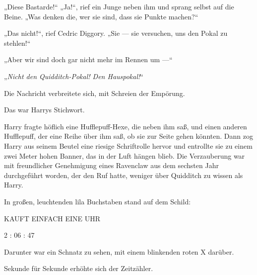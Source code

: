 „Diese Bastarde!“
„Ja!“, rief ein Junge neben ihm und sprang selbst auf die Beine.
„Was denken die, wer sie sind, dass sie Punkte machen?“

„Das nicht!“, rief Cedric Diggory.
„Sie — sie versuchen, uns den Pokal zu stehlen!“

„Aber wir sind doch gar nicht mehr im Rennen um —“

„\emph{Nicht den Quidditch-Pokal! Den Hauspokal!}“

Die Nachricht verbreitete sich, mit Schreien der Empörung.

Das war Harrys Stichwort.

Harry fragte höflich eine Hufflepuff-Hexe, die neben ihm saß, und einen anderen Hufflepuff, der eine Reihe über ihm saß, ob sie zur Seite gehen könnten. Dann zog Harry aus seinem Beutel eine riesige Schriftrolle hervor und entrollte sie zu einem zwei Meter hohen Banner, das in der Luft hängen blieb. Die Verzauberung war mit freundlicher Genehmigung eines Ravenclaw aus dem sechsten Jahr durchgeführt worden, der den Ruf hatte, weniger über Quidditch zu wissen als Harry.

In großen, leuchtenden lila Buchstaben stand auf dem Schild:

\begin{center}
KAUFT EINFACH EINE UHR

2 : 06 : 47
\end{center}

Darunter war ein Schnatz zu sehen, mit einem blinkenden roten X darüber.

\later

Sekunde für Sekunde erhöhte sich der Zeitzähler.

